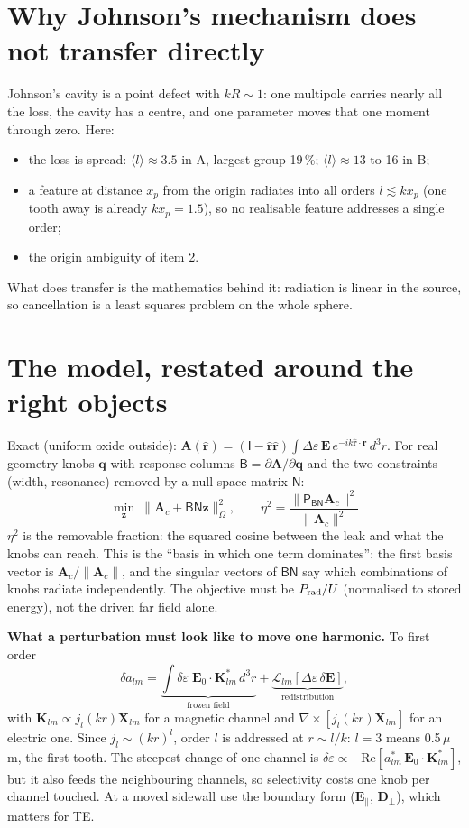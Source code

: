 \documentclass[11pt,a4paper]{article}
\begin{document}
\section{Why Johnson's mechanism does not transfer directly}
Johnson's cavity is a point defect with $kR\sim1$: one multipole carries nearly all the loss, the cavity has a
centre, and one parameter moves that one moment through zero. Here:
\begin{itemize}
\item the loss is spread: $\langle l\rangle\approx3.5$ in A, largest group 19\,\%; $\langle l\rangle\approx13$ to 16 in B;
\item a feature at distance $x_p$ from the origin radiates into all orders $l\lesssim kx_p$ (one tooth away is
already $kx_p=1.5$), so no realisable feature addresses a single order;
\item the origin ambiguity of item 2.
\end{itemize}
What does transfer is the mathematics behind it: radiation is linear in the source, so cancellation is a least
squares problem on the whole sphere.

\section{The model, restated around the right objects}
Exact (uniform oxide outside): $\mathbf A(\hat{\mathbf r})=(\mathsf I-\hat{\mathbf r}\hat{\mathbf r})\int\Delta\varepsilon\,\mathbf E\,
e^{-ik\hat{\mathbf r}\cdot\mathbf r}\,d^3r$. For real geometry knobs $\mathbf q$ with response columns
$\mathsf B=\partial\mathbf A/\partial\mathbf q$ and the two constraints (width, resonance) removed by a null space
matrix $\mathsf N$:
\begin{equation}\label{eq:eta}
\min_{\mathbf z}\ \|\mathbf A_c+\mathsf{BN}\mathbf z\|^2_\Omega ,\qquad
\eta^2=\frac{\|\mathsf P_{\mathsf{BN}}\mathbf A_c\|^2}{\|\mathbf A_c\|^2}
\end{equation}
$\eta^2$ is the removable fraction: the squared cosine between the leak and what the knobs can reach. This is the
``basis in which one term dominates'': the first basis vector is $\mathbf A_c/\|\mathbf A_c\|$, and the
singular vectors of $\mathsf{BN}$ say which combinations of knobs radiate independently. The objective must be
$P_{\rm rad}/U$ (normalised to stored energy), not the driven far field alone.

\textbf{What a perturbation must look like to move one harmonic.} To first order
\[
\delta a_{lm}=\underbrace{\int\delta\varepsilon\;\mathbf E_0\cdot\mathbf K_{lm}^*\,d^3r}_{\text{frozen field}}
+\underbrace{\mathcal L_{lm}[\Delta\varepsilon\,\delta\mathbf E]}_{\text{redistribution}},
\]
with $\mathbf K_{lm}\propto j_l(kr)\mathbf X_{lm}$ for a magnetic channel and
$\nabla\times[j_l(kr)\mathbf X_{lm}]$ for an electric one.
Since $j_l\sim(kr)^l$, order $l$ is addressed at $r\sim l/k$: $l=3$ means 0.5\,$\mu$m, the first tooth. The
steepest change of one channel is $\delta\varepsilon\propto-\mathrm{Re}[a_{lm}^*\,\mathbf E_0\cdot\mathbf K^*_{lm}]$,
but it also feeds the neighbouring channels, so selectivity costs one knob per channel touched. At a moved
sidewall use the boundary form ($\mathbf E_\parallel$, $\mathbf D_\perp$), which matters for TE.
\end{document}
